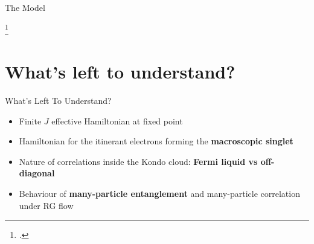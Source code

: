 \documentclass[aspectratio=169]{beamer}
\begin{document}
\begin{frame}[noframenumbering]{The Model}
{\begin{minipage}{0.6\textwidth}
\end{minipage}
\begin{minipage}{0.35\textwidth}
\end{minipage}
\footcite{anderson1969exact,anderson1970,wilson1975,andreiKondoreview,andrei_kondo,wiegmann_kondoexact_1981}
}
\end{frame}

\section{What's left to understand?}
\begin{frame}[noframenumbering]{What's Left To Understand?}
  
\begin{itemize}[<+-|alert@+>]
	\item Finite \(J\) effective Hamiltonian at fixed point
	\vspace*{20pt}
	\item Hamiltonian for the itinerant electrons forming the \textbf{macroscopic singlet}
	\vspace*{20pt}
	\item Nature of correlations inside the Kondo cloud: \textbf{Fermi liquid vs off-diagonal}
	\vspace*{20pt}
	\item Behaviour of \textbf{many-particle entanglement} and many-particle correlation under RG flow
\end{itemize}

\end{frame}
\end{document}

